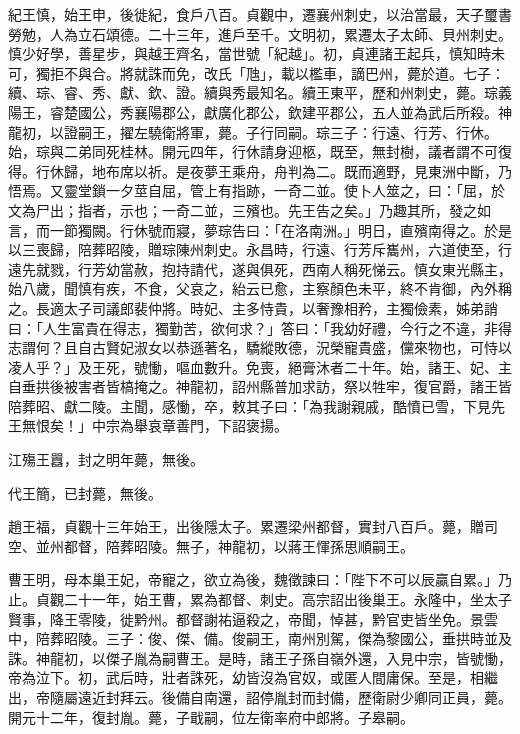 \begin{pinyinscope}
 紀王慎，始王申，後徙紀，食戶八百。貞觀中，遷襄州刺史，以治當最，天子璽書勞勉，人為立石頌德。二十三年，進戶至千。文明初，累遷太子太師、貝州刺史。慎少好學，善星步，與越王齊名，當世號「紀越」。初，貞連諸王起兵，慎知時未可，獨拒不與合。將就誅而免，改氏「虺」，載以檻車，謫巴州，薨於道。七子：續、琮、睿、秀、獻、欽、證。續與秀最知名。續王東平，歷和州刺史，薨。琮義陽王，睿楚國公，秀襄陽郡公，獻廣化郡公，欽建平郡公，五人並為武后所殺。神龍初，以證嗣王，擢左驍衛將軍，薨。子行同嗣。琮三子：行遠、行芳、行休。始，琮與二弟同死桂林。開元四年，行休請身迎柩，既至，無封樹，議者謂不可復得。行休歸，地布席以祈。是夜夢王乘舟，舟判為二。既而適野，見東洲中斷，乃悟焉。又靈堂鎖一夕莖自屈，管上有指跡，一奇二並。使卜人筮之，曰：「屈，於文為尸出；指者，示也；一奇二並，三殯也。先王告之矣。」乃趣其所，發之如言，而一節獨闕。行休號而寢，夢琮告曰：「在洛南洲。」明日，直殯南得之。於是以三喪歸，陪葬昭陵，贈琮陳州刺史。永昌時，行遠、行芳斥巂州，六道使至，行遠先就戮，行芳幼當赦，抱持請代，遂與俱死，西南人稱死悌云。慎女東光縣主，始八歲，聞慎有疾，不食，父哀之，紿云已愈，主察顏色未平，終不肯御，內外稱之。長適太子司議郎裴仲將。時妃、主多恃貴，以奢豫相矜，主獨儉素，姊弟誚曰：「人生富貴在得志，獨勤苦，欲何求？」答曰：「我幼好禮，今行之不違，非得志謂何？且自古賢妃淑女以恭遜著名，驕縱敗德，況榮寵貴盛，儻來物也，可恃以凌人乎？」及王死，號慟，嘔血數升。免喪，絕膏沐者二十年。始，諸王、妃、主自垂拱後被害者皆槁掩之。神龍初，詔州縣普加求訪，祭以牲牢，復官爵，諸王皆陪葬昭、獻二陵。主聞，感慟，卒，敕其子曰：「為我謝親戚，酷憤已雪，下見先王無恨矣！」中宗為舉哀章善門，下詔褒揚。



 江殤王囂，封之明年薨，無後。



 代王簡，已封薨，無後。



 趙王福，貞觀十三年始王，出後隱太子。累遷梁州都督，實封八百戶。薨，贈司空、並州都督，陪葬昭陵。無子，神龍初，以蔣王惲孫思順嗣王。



 曹王明，母本巢王妃，帝寵之，欲立為後，魏徵諫曰：「陛下不可以辰贏自累。」乃止。貞觀二十一年，始王曹，累為都督、刺史。高宗詔出後巢王。永隆中，坐太子賢事，降王零陵，徙黔州。都督謝祐逼殺之，帝聞，悼甚，黔官吏皆坐免。景雲中，陪葬昭陵。三子：俊、傑、備。俊嗣王，南州別駕，傑為黎國公，垂拱時並及誅。神龍初，以傑子胤為嗣曹王。是時，諸王子孫自嶺外還，入見中宗，皆號慟，帝為泣下。初，武后時，壯者誅死，幼皆沒為官奴，或匿人間庸保。至是，相繼出，帝隨屬遠近封拜云。後備自南還，詔停胤封而封備，歷衛尉少卿同正員，薨。開元十二年，復封胤。薨，子戢嗣，位左衛率府中郎將。子皋嗣。




\end{pinyinscope}
